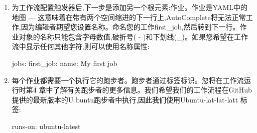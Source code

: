 \begin{enumerate}
如果您在第一个元素之后添加逗号,然后再次单击“控制+空间,则可以从AutoComp lete中选择其他元素(请参见图1.11):


每个触发器都是地图,可以包含其他参数。如果将光标放在下面的线路上:添加两个空间缩进,AutoComplete将为您提供完整YAML语法的结果。它还将为您提供可用于配置每个触发的属性(请参见图1.12):


请注意,大多数参数(例如,分支或路径)是序列,如果您不使用JSON语法,则每个条目都需要破折号。

我们希望我们的测试工作流程在每次推动到主分支上运行。我们还希望能够手动触发它(请参阅触发工作流程的事件)。您的触发器工作流程代码应该看起来像这样:

\begin{shell}
on:
  push:
    branches:
      - main
  workflow_dispatch:
\end{shell}

\begin{myNotic}{通配符}
*可以用作路径中的通配符,而**则可以用作递归通配符。 *是YAML中的特殊角色,因此您需要在这种情况下使用引号:

\begin{shell}
push:
  branches:
    - 'release/**'
  paths:
    - 'doc/**'
\end{shell}
\end{myNotic}

\item 
为工作流配置触发器后,下一步是添加另一个根元素:作业。作业是YAML中的地图 --- 这意味着在带有两个空间缩进的下一行上,AutoComplete将无法正常工作,因为编辑者期望您设置名称。命名您的工作first\_job,然后转到下一行。作业对象的名称只能包含字母数值,破折号( - )和下划线(\_)。如果您希望在工作流中显示任何其他字符,则可以使用名称属性:

\begin{shell}
jobs:
  first_job:
    name: My first job
\end{shell}

\item 
每个作业都需要一个执行它的跑步者。跑步者通过标签标识。您将在工作流运行时第4 章中了解有关跑步者的更多信息。我们希望我们的工作流程在GitHub提供的最新版本的U buntu跑步者中执行,因此我们使用Ubuntu-lat-lat-latt 标签:

\begin{shell}
runs-on: ubuntu-latest
\end{shell}


\end{enumerate}
